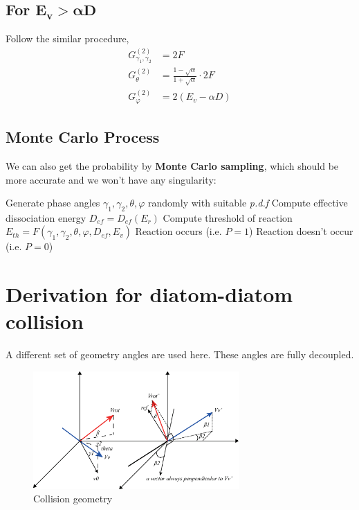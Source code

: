 \documentclass[11pt,letterpaper]{article}
\renewcommand{\phi}{\varphi}
\begin{document}
\subsection{For $ \pmb{E_v>\alpha D} $}
Follow the similar procedure,
\begin{equation}
\begin{aligned}
G_{\gamma_1,\gamma_2}^{(2)} & = 2F \\
G_{\theta}^{(2)} & = \frac{1-\sqrt{\alpha}}{1+\sqrt{\alpha}}\cdot 2F\\
G_{\phi}^{(2)} & = 2(E_v - \alpha D)
\end{aligned}
\end{equation}
\subsection{Monte Carlo Process}
We can also get the probability by \textbf{Monte Carlo sampling}, which should be more accurate and we won't have any singularity:
\begin{algorithm}
	\begin{algorithmic}[1]
		\State Generate phase angles $ \gamma_1,\gamma_2,\theta,\phi $ randomly with suitable \textit{p.d.f}
		\State Compute effective dissociation energy $ D_{ef}=D_{ef}(E_r) $
		\State Compute threshold of reaction $ E_{th}=F(\gamma_1,\gamma_2,\theta,\phi,D_{ef},E_v) $
		\State Reaction occurs (i.e. $ P=1 $)
		\Else 
		\State Reaction doesn't occur (i.e. $ P=0 $)
		\EndIf
		\EndProcedure
	\end{algorithmic}
\end{algorithm}

\section{Derivation for diatom-diatom collision}
A different set of geometry angles are used here. These angles are fully decoupled.
\begin{figure}[h]
	\centering
	\includegraphics[width=0.7\textwidth]{geom}
	\caption{Collision geometry}
\end{figure}
\end{document}
